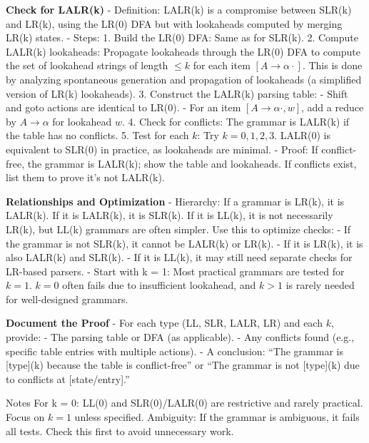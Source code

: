 \textbf{Check for LALR(k)}
   - Definition: LALR(k) is a compromise between SLR(k) and LR(k), using the LR(0) DFA but with lookaheads computed by merging LR(k) states.
   - Steps:
     1. Build the LR(0) DFA: Same as for SLR(k).
     2. Compute LALR(k) lookaheads: Propagate lookaheads through the LR(0) DFA to compute the set of lookahead strings of length \( \leq k \) for each item \( [A \to \alpha \cdot] \). This is done by analyzing spontaneous generation and propagation of lookaheads (a simplified version of LR(k) lookaheads).
     3. Construct the LALR(k) parsing table:
        - Shift and goto actions are identical to LR(0).
        - For an item \( [A \to \alpha \cdot, w] \), add a reduce by \( A \to \alpha \) for lookahead \( w \).
     4. Check for conflicts: The grammar is LALR(k) if the table has no conflicts.
     5. Test for each \( k \): Try \( k = 0, 1, 2, 3 \). LALR(0) is equivalent to SLR(0) in practice, as lookaheads are minimal.
   - Proof: If conflict-free, the grammar is LALR(k); show the table and lookaheads. If conflicts exist, list them to prove it’s not LALR(k).

\textbf{Relationships and Optimization}
   - Hierarchy: If a grammar is LR(k), it is LALR(k). If it is LALR(k), it is SLR(k). If it is LL(k), it is not necessarily LR(k), but LL(k) grammars are often simpler. Use this to optimize checks:
     - If the grammar is not SLR(k), it cannot be LALR(k) or LR(k).
     - If it is LR(k), it is also LALR(k) and SLR(k).
     - If it is LL(k), it may still need separate checks for LR-based parsers.
   - Start with k = 1: Most practical grammars are tested for \( k = 1 \). \( k = 0 \) often fails due to insufficient lookahead, and \( k > 1 \) is rarely needed for well-designed grammars.

\textbf{Document the Proof}
   - For each type (LL, SLR, LALR, LR) and each \( k \), provide:
     - The parsing table or DFA (as applicable).
     - Any conflicts found (e.g., specific table entries with multiple actions).
     - A conclusion: “The grammar is [type](k) because the table is conflict-free” or “The grammar is not [type](k) due to conflicts at [state/entry].”

Notes
For k = 0: LL(0) and SLR(0)/LALR(0) are restrictive and rarely practical. Focus on \( k = 1 \) unless specified.
Ambiguity: If the grammar is ambiguous, it fails all tests. Check this first to avoid unnecessary work.
